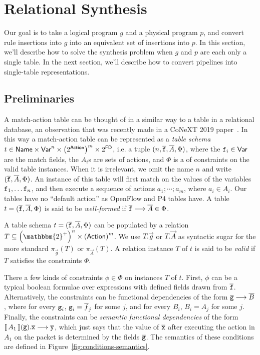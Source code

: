 \section{Relational Synthesis}

Our goal is to take a logical program $g$ and a physical program $p$,
and convert rule insertions into $g$ into an equivalent set of
insertions into $p$. In this section, we'll describe how to solve the
synthesis problem when $g$ and $p$ are each only a single table. In
the next section, we'll describe how to convert pipelines into
single-table representations.

\subsection{Preliminaries}
A match-action table can be thought of in a similar way to a table in
a relational database, an observation that was recently made in a
CoNeXT 2019 paper~\cite{Chiesa}. In this way a match-action table can
be represented as a \emph{table schema}
$t \in \mathsf{Name} \times \mathsf{Var}^n \times \left(2^{\mathsf{Action}}\right)^m
\times 2^{\mathsf{FD}}$, i.e. a tuple $(n,\overline{\texttt{f}}, \overline{A}, \Phi)$, where
the $\texttt{f}_i \in \mathsf{Var}$ are the match fields, the $A_i$s are sets of
actions, and $\Phi$ is a of constraints on the valid table
instances. When it is irrelevant, we omit the name $n$ and write
$(\overline{\texttt{f}}, \overline{A}, \Phi)$. An instance of this table will first
match on the values of the variables $\texttt{f}_1, \ldots \texttt{f}_n$, and
then execute a sequence of actions $a_1;\cdots;a_m$, where
$a_i \in A_i$. Our tables have no ``default action'' as OpenFlow and
P4 tables have. A table $t = (\overline{\texttt{f}}, \overline{A}, \Phi)$ is said to
be \emph{well-formed} if
$\overline{\texttt{f}}\longrightarrow \overline{A} \in \Phi$.

A table schema $t = (\overline{\texttt{f}}, \overline{A}, \Phi)$ can be populated by
a relation
$T \subseteq \left(\mathbbm {2}^+\right)^n \times
\left(\mathsf{Action}\right)^m$. We use $T.\vec g$ or $T.\vec A$ as
syntactic sugar for the more standard $\pi_{\vec g}(T)$ or
$\pi_{\vec A}(T)$. A relation instance $T$ of $t$ is said to be
\emph{valid} if $T$ satisfies the constraints $\Phi$.

There a few kinds of constraints $ \phi \in \Phi$ on instances $T$ of
$t$. First, $\phi$ can be a typical boolean formulae over expressions
with defined fields drawn from $\overline{\texttt{f}}$. Alternatively, the
constraints can be functional dependencies of the form
$\overline{\texttt{g}} \longrightarrow \overline{B}$, where for every $\texttt{g}_i$,
$\texttt{g}_i = \overline{f}_j$ for some $j$, and for every $B_i$, $B_i = A_j$
for some $j$. Finally, the constraints can be \emph{semantic
  functional dependencies} of the form
$\llbracket\,A_1\,\rrbracket(\overline{\texttt{g}}).\overline{\texttt{x}} \longrightarrow \overline{\texttt{y}}$, which just says that the value of $\overline{\texttt{x}}$ after
executing the action in $A_1$ on the packet is determined by the
fields $\overline{\texttt{g}}$. The semantics of these conditions are defined
in Figure~\ref{fig:conditions-semantics}.

